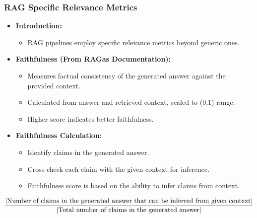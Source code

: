 \begin{frame}[fragile]\frametitle{RAG Specific Relevance Metrics}
  \begin{itemize}
    \item \textbf{Introduction:}
      \begin{itemize}
        \item RAG pipelines employ specific relevance metrics beyond generic ones.
      \end{itemize}
    \item \textbf{Faithfulness (From RAGas Documentation):}
      \begin{itemize}
        \item Measures factual consistency of the generated answer against the provided context.
        \item Calculated from answer and retrieved context, scaled to (0,1) range.
        \item Higher score indicates better faithfulness.
      \end{itemize}
    \item \textbf{Faithfulness Calculation:}
      \begin{itemize}
        \item Identify claims in the generated answer.
        \item Cross-check each claim with the given context for inference.
        \item Faithfulness score is based on the ability to infer claims from context.
      \end{itemize}
  \end{itemize}
  
$${|\text{Number of claims in the generated answer that can be inferred from given context}| \over |\text{Total number of claims in the generated answer}|}$$  

\end{frame}

